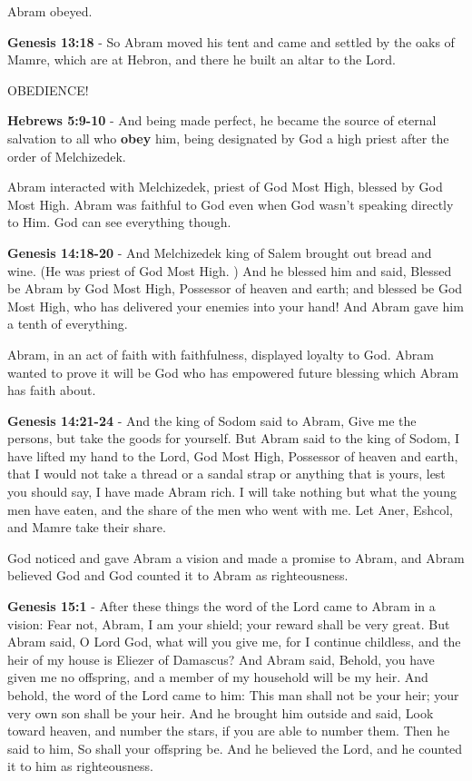 \documentclass[11pt]{article}
\begin{document}
Abram obeyed.

\textbf{Genesis 13:18} - So Abram moved his tent and came and settled by the oaks of Mamre, which are at Hebron, and there he built an altar to the Lord.

OBEDIENCE!

\textbf{Hebrews 5:9-10} - And being made perfect, he became the source of eternal salvation to all who \textbf{obey} him, being designated by God a high priest after the order of Melchizedek.

Abram interacted with Melchizedek, priest of God Most High, blessed by God Most High. Abram was faithful to God even when God wasn't speaking directly to Him. God can see everything though.

\textbf{Genesis 14:18-20} - And Melchizedek king of Salem brought out bread and wine. (He was priest of God Most High. ) And he blessed him and said, Blessed be Abram by God Most High, Possessor of heaven and earth; and blessed be God Most High, who has delivered your enemies into your hand! And Abram gave him a tenth of everything.

Abram, in an act of faith with faithfulness, displayed loyalty to God. Abram wanted to prove it will be God who has empowered future blessing which Abram has faith about.

\textbf{Genesis 14:21-24} - And the king of Sodom said to Abram, Give me the persons, but take the goods for yourself. But Abram said to the king of Sodom, I have lifted my hand to the Lord, God Most High, Possessor of heaven and earth, that I would not take a thread or a sandal strap or anything that is yours, lest you should say, I have made Abram rich. I will take nothing but what the young men have eaten, and the share of the men who went with me. Let Aner, Eshcol, and Mamre take their share.

God noticed and gave Abram a vision and made a promise to Abram, and Abram believed God and God counted it to Abram as righteousness.

\textbf{Genesis 15:1} - After these things the word of the Lord came to Abram in a vision: Fear not, Abram, I am your shield; your reward shall be very great. But Abram said, O Lord God, what will you give me, for I continue childless, and the heir of my house is Eliezer of Damascus? And Abram said, Behold, you have given me no offspring, and a member of my household will be my heir. And behold, the word of the Lord came to him: This man shall not be your heir; your very own son shall be your heir. And he brought him outside and said, Look toward heaven, and number the stars, if you are able to number them. Then he said to him, So shall your offspring be. And he believed the Lord, and he counted it to him as righteousness.
\end{document}
